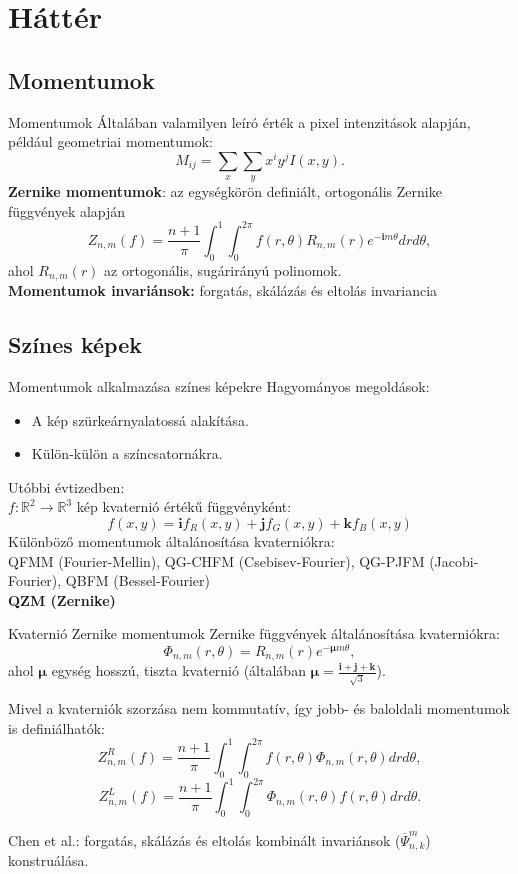 \documentclass{beamer}
\newcommand{\R}{\mathbb{R}}
\newcommand{\qi}{\textbf{i}}
\newcommand{\qj}{\textbf{j}}
\newcommand{\qk}{\textbf{k}}
\newcommand{\qmu}{\boldsymbol{\mu}}
\def\R{{\mathbb R}}
\begin{document}
\section{Háttér}
\subsection{Momentumok}
\begin{frame}{Momentumok}
Általában valamilyen leíró érték a pixel intenzitások alapján, 
például geometriai momentumok: $$M_{ij} = \sum_x\sum_y x^i y^j I(x,y).$$
\textbf{Zernike momentumok}: az egységkörön definiált, ortogonális Zernike függvények alapján
$$Z_{n,m}(f) = \frac{n+1}{\pi}\int_0^1\int_0^{2\pi}f(r,\theta)R_{n,m}(r)e^{-\qi m\theta} dr d\theta,$$ ahol $R_{n,m}(r)$ az ortogonális, sugárirányú polinomok.\\

\textbf{Momentumok invariánsok:} forgatás, skálázás és eltolás invariancia 
\end{frame}

\subsection{Színes képek}
\begin{frame}{Momentumok alkalmazása színes képekre}
Hagyományos megoldások:
\begin{itemize}
    \item A kép szürkeárnyalatossá alakítása.
    \item Külön-külön a színcsatornákra.
\end{itemize}
Utóbbi évtizedben:\\
$f : \R^2 \rightarrow \R^3$ kép kvaternió értékű függvényként:
$$f(x,y) = \qi f_R(x,y) + \qj f_G(x,y) + \qk f_B(x,y)$$
Különböző momentumok általánosítása kvaterniókra:\\
QFMM (Fourier-Mellin), QG-CHFM (Csebisev-Fourier), QG-PJFM (Jacobi-Fourier), QBFM (Bessel-Fourier) \\
\textbf{QZM (Zernike)}
\end{frame}

\begin{frame}{Kvaternió Zernike momentumok}
Zernike függvények általánosítása kvaterniókra: $$\Phi_{n,m}(r,\theta) = R_{n,m}(r)e^{-\qmu m \theta},$$ ahol $\qmu$ egység hosszú, tiszta kvaternió (általában $\qmu = \frac{\qi + \qj + \qk}{\sqrt{3}}$).

Mivel a kvaterniók szorzása nem kommutatív, így jobb- és baloldali momentumok is definiálhatók:
$$Z^R_{n,m}(f) = \frac{n+1}{\pi}\int_0^1\int_0^{2\pi}f(r,\theta)\Phi_{n,m}(r,\theta) dr d\theta,$$
$$Z^L_{n,m}(f) = \frac{n+1}{\pi}\int_0^1\int_0^{2\pi}\Phi_{n,m}(r,\theta)f(r,\theta) dr d\theta.$$

Chen et al.: forgatás, skálázás és eltolás kombinált invariánsok ($\overline{\Psi}_{n,k}^m$) konstruálása.
\end{frame}
\end{document}
